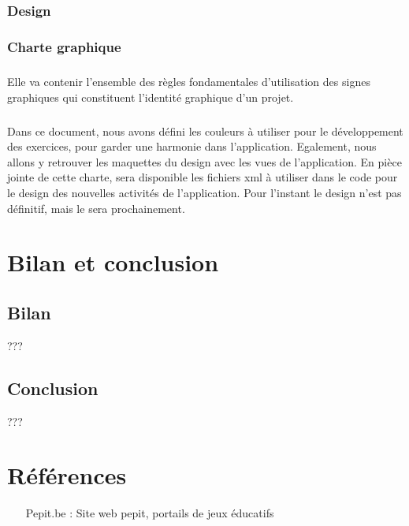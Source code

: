 \documentclass[french]{report}
\begin{document}
\subsection{Design}

\subsection{Charte graphique}
\paragraph{}Elle va contenir l'ensemble des règles fondamentales d'utilisation des signes graphiques qui constituent l'identité graphique d'un projet.
\paragraph{}Dans ce document, nous avons défini les couleurs à utiliser pour le développement des exercices, pour garder une harmonie dans l'application. Egalement, nous allons y retrouver les maquettes du design avec les vues de l'application. En pièce jointe de cette charte, sera disponible les fichiers xml à utiliser dans le code pour le design des nouvelles activités de l'application. Pour l'instant le design n'est pas définitif, mais le sera prochainement.

\chapter*{Bilan et conclusion}
\section*{Bilan}
???
\section*{Conclusion}
???



\appendix 


\chapter{Références}
\begin{itemize}
\item[Pepit.be :] Site web pepit, portails de jeux éducatifs
\end{itemize}
\end{document}
